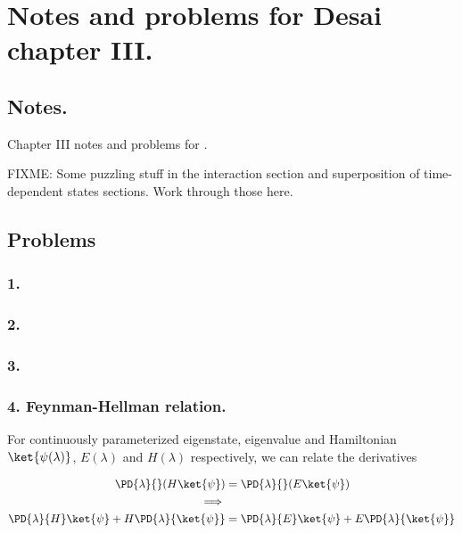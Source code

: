 
%

\chapter{Notes and problems for Desai chapter III.}
\label{chap:desaiCh3}
{}
\date{Oct 1, 2010}

\beginArtWithToc

\section{Notes.}

Chapter III notes and problems for \cite{desai2009quantum}.

FIXME:
Some puzzling stuff in the interaction section and superposition of time-dependent states sections.  Work through those here.

\section{Problems}

\subsection{1. }
\subsection{2. }
\subsection{3. }
\subsection{4. Feynman-Hellman relation.}

For continuously parameterized eigenstate, eigenvalue and Hamiltonian $\ket{\psi(\lambda)}$, $E(\lambda)$ and $H(\lambda)$ respectively, we can relate the derivatives

\begin{align*}
\PD{\lambda}{} ( H \ket{\psi} ) &= \PD{\lambda}{} ( E \ket{\psi} ) \\
\implies \\
\PD{\lambda}{H} \ket{\psi} +H \PD{\lambda}{\ket{\psi}} &= \PD{\lambda}{E} \ket{\psi} + E \PD{\lambda}{\ket{\psi} } 
\end{align*}

